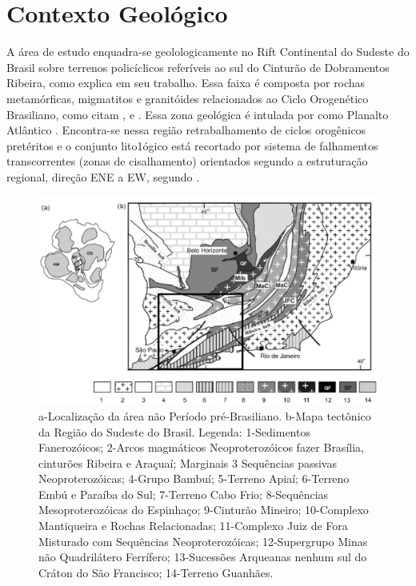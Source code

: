 \chapter{Contexto Geológico}

A área de estudo enquadra-se geolologicamente no Rift Continental do Sudeste do Brasil sobre terrenos policíclicos referíveis ao sul do Cinturão de Dobramentos Ribeira, como explica \cite{Riccomini_1989} em seu trabalho. Essa faixa é composta por rochas metamórficas,
migmatitos e granitóides relacionados ao Ciclo Orogenético Brasiliano, como citam \cite{kuhn_metamorphic_2004}, \cite{heilbron_evolution_2010} e \cite{valeriano_u_pb_2011}. Essa zona geológica é intulada por \cite{Almeida_Carneiro_1998} como Planalto Atlântico . Encontra-se nessa região retrabalhamento de ciclos orogênicos pretéritos e o conjunto lito1ógico está recortado por sistema de falhamentos transcorrentes (zonas de cisalhamento) orientados segundo a estruturação regional, direção ENE a EW, segundo \cite{Hasui_Sadowski_1976}.

\begin{figure}[!ht]
\centering
\includegraphics[scale=0.5]{mapa_geologico.png}
\caption{a-Localização da área não Período pré-Brasiliano. b-Mapa tectônico da Região do Sudeste do Brasil. Legenda: 1-Sedimentos Fanerozóicos; 2-Arcos magmáticos Neoproterozóicos fazer Brasília, cinturões Ribeira e Araçuaí; Marginais 3 Sequências passivas Neoproterozóicas; 4-Grupo Bambuí; 5-Terreno Apiaí; 6-Terreno Embú e Paraíba do Sul; 7-Terreno Cabo Frio; 8-Sequências Mesoproterozóicas do Espinhaço; 9-Cinturão Mineiro; 10-Complexo Mantiqueira e Rochas Relacionadas; 11-Complexo Juiz de Fora Misturado com Sequências Neoproterozóicas; 12-Supergrupo Minas não Quadrilátero Ferrífero; 13-Sucessões Arqueanas nenhum sul do Cráton do São Francisco; 14-Terreno Guanhães.}
\label{mapa_geologico}
\end{figure} 

